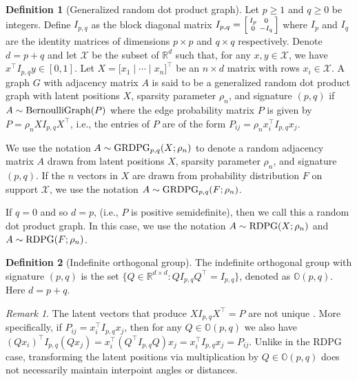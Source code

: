 \documentclass[
  12pt,
]{article}
\theoremstyle{definition}
\newtheorem{definition}{Definition}[section]
\theoremstyle{definition}
\theoremstyle{definition}
\theoremstyle{definition}
\theoremstyle{remark}
\newtheorem*{remark}{Remark}
\begin{document}
\begin{definition}[Generalized random dot product graph]
\label{def:grdpg}
Let $p \geq 1$ and $q \geq 0$ be integers. 
Define $I_{p,q}$ as the block diagonal matrix $I_{p,q} = \Bigl[\begin{smallmatrix} I_{p} & 0 \\ 0 & - I_{q} \end{smallmatrix} \Bigr]$ where $I_p$ and $I_q$ are the identity matrices of dimensions $p \times p$ and $q \times q$ respectively. 
Denote $d = p + q$ and let $\mathcal{X}$ be the subset of $\mathbb{R}^d$ such that, for any $x, y \in \mathcal{X}$, we have $x^\top I_{p,q} y \in [0, 1]$. 
Let $X = \Big[ x_1 \mid \cdots \mid x_n \Big]^\top$ be an $n \times d$ matrix with rows $x_i \in \mathcal{X}$. 
A graph $G$ with adjacency matrix $A$ is said to be a generalized random dot product graph with latent positions $X$, sparsity parameter $\rho_n$, and signature $(p, q)$ if $A \sim \mathrm{BernoulliGraph}(P)$ where the edge probability matrix $P$ is given by $P = \rho_n X I_{p,q} X^\top$, i.e., the entries of $P$ are of the form $P_{ij} = \rho_n x_i^\top I_{p,q} x_j$. 

We use the notation $A \sim \mathrm{GRDPG}_{p,q}(X; \rho_n)$ to denote a random adjacency matrix $A$ drawn from latent positions $X$, sparsity parameter $\rho_n$, and signature $(p, q)$. If the $n$ vectors in $X$ are drawn from probability distribution $F$ on support $\mathcal{X}$, we use the notation $A \sim \mathrm{GRDPG}_{p,q}(F; \rho_n)$. 

If $q = 0$ and so $d = p$, (i.e., $P$ is positive semidefinite), then we call this a random dot product graph. 
In this case, we use the notation $A \sim \mathrm{RDPG}(X; \rho_n)$ and $A \sim \mathrm{RDPG}(F; \rho_n)$. 
\end{definition}

\begin{definition}[Indefinite orthogonal group]
\label{def:indefinite}
The indefinite orthogonal group with signature $(p, q)$ is
the set $\{Q \in \mathbb{R}^{d \times d} \colon Q I_{p, q} Q^{\top} = I_{p, q}\}$,
denoted as $\mathbb{O}(p, q)$. Here $d = p + q$. 
\end{definition}

\begin{remark}
\label{rem:non_identifiable}
The latent vectors that produce $X I_{p,q} X^\top = P$ are not unique
\citep{rubindelanchy2017statistical}.
More specifically, if $P_{ij} = x_i^\top I_{p, q} x_j$, then for any $Q \in \mathbb{O}(p, q)$ we also have 
$(Q x_i)^\top I_{p, q} (Q x_j) = x_i^\top (Q^\top I_{p, q} Q) x_j = x_i^\top I_{p, q} x_j = P_{ij}$. 
Unlike in the RDPG case, transforming the latent positions via multiplication by $Q \in \mathbb{O}(p, q)$ does not necessarily maintain interpoint angles or distances.
\end{remark}
\end{document}
